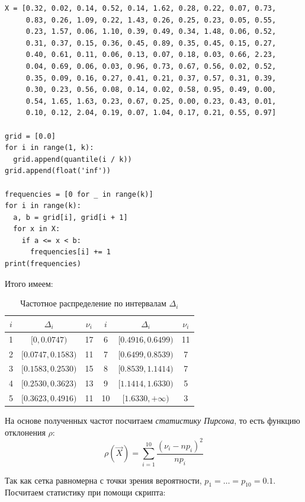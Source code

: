 \begin{lstlisting}[caption=Расчёт частотного распределения выборки]
X = [0.32, 0.02, 0.14, 0.52, 0.14, 1.62, 0.28, 0.22, 0.07, 0.73,
     0.83, 0.26, 1.09, 0.22, 1.43, 0.26, 0.25, 0.23, 0.05, 0.55,
     0.23, 1.57, 0.06, 1.10, 0.39, 0.49, 0.34, 1.48, 0.06, 0.52,
     0.31, 0.37, 0.15, 0.36, 0.45, 0.89, 0.35, 0.45, 0.15, 0.27,
     0.40, 0.61, 0.11, 0.06, 0.13, 0.07, 0.18, 0.03, 0.66, 2.23,
     0.04, 0.69, 0.06, 0.03, 0.96, 0.73, 0.67, 0.56, 0.02, 0.52,
     0.35, 0.09, 0.16, 0.27, 0.41, 0.21, 0.37, 0.57, 0.31, 0.39,
     0.30, 0.23, 0.56, 0.08, 0.14, 0.02, 0.58, 0.95, 0.49, 0.00,
     0.54, 1.65, 1.63, 0.23, 0.67, 0.25, 0.00, 0.23, 0.43, 0.01,
     0.10, 0.12, 2.04, 0.19, 0.07, 1.04, 0.17, 0.21, 0.55, 0.97]

grid = [0.0]
for i in range(1, k):
  grid.append(quantile(i / k))
grid.append(float('inf'))

frequencies = [0 for _ in range(k)]
for i in range(k):
  a, b = grid[i], grid[i + 1]
  for x in X:
    if a <= x < b:
      frequencies[i] += 1
print(frequencies)
\end{lstlisting}

Итого имеем:

\begin{table}[H]
\centering
\begin{tabular}{|c|c|c||c|c|c|}
\hline
$i$ & $\Delta_i$ & $\nu_i$ & $i$ & $\Delta_i$ & $\nu_i$ \\
\hline \hline
1   & $[0, 0.0747)$       & 17 & 6   & $[0.4916, 0.6499)$ & 11 \\
\hline
2   & $[0.0747, 0.1583)$  & 11 & 7   & $[0.6499, 0.8539)$ & 7  \\
\hline
3   & $[0.1583, 0.2530)$  & 15 & 8   & $[0.8539, 1.1414)$ & 7  \\
\hline
4   & $[0.2530, 0.3623)$  & 13 & 9   & $[1.1414, 1.6330)$ & 5  \\
\hline
5   & $[0.3623, 0.4916)$  & 11 & 10  & $[1.6330, +\infty)$ & 3  \\
\hline
\end{tabular}
\caption{Частотное распределение по интервалам \( \Delta_i \)}
\end{table}

На основе полученных частот посчитаем \textit{статистику Пирсона}, то есть функцию отклонения \( \rho \):
\[
    \rho(\vec{X})=\sum_{i=1}^{10}\dfrac{(\nu_i-np_i)^2}{np_i}
\]

Так как сетка равномерна с точки зрения вероятности, \( p_1=\dots=p_{10}=0.1 \). Посчитаем статистику при помощи скрипта:

